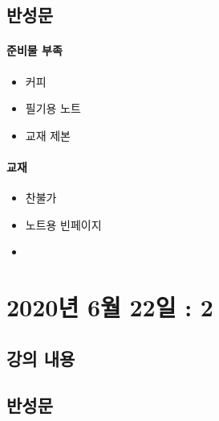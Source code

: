 \documentclass[12pt, a4paper, oneside]{book}
\let\stdsection\section
\renewcommand\section{\newpage\stdsection}
\begin{document}
		\subsection{반성문}

\paragraph{	준비물 부족}
			\begin{itemize}	[
							topsep=0.0em, 
							parsep=0.0em, 
							itemsep=0em, 
							leftmargin=6.0em, 
							labelwidth=3em, 
							labelsep=3em
							] 
			\item 커피
			\item 필기용 노트
			\item 교재 제본
			\end{itemize}


\paragraph{교재}
			\begin{itemize}	[
							topsep=0.0em, 
							parsep=0.0em, 
							itemsep=0em, 
							leftmargin=6.0em, 
							labelwidth=3em, 
							labelsep=3em
							] 
			\item 찬불가
			\item 노트용 빈페이지
			\item 
			\end{itemize}



%
	\section{2020년 6월 22일 : 2}

		\subsection{강의 내용}

		\subsection{반성문}


%
\end{document}
